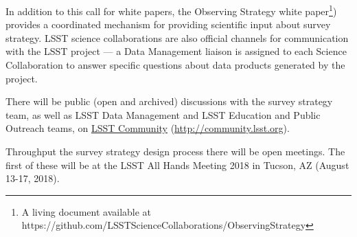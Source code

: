 \documentclass[DM,lsstdraft,toc,usenatbib]{lsstdoc}
\begin{document}
In addition to this call for white papers, the Observing Strategy white paper\footnote{A living document available at https://github.com/LSSTScienceCollaborations/ObservingStrategy}) provides a coordinated mechanism for providing scientific input about survey strategy. LSST science collaborations are also official channels for communication with the LSST project --- a Data Management liaison is assigned to each Science Collaboration to answer specific questions about data products generated by the project.

There will be public (open and archived) discussions with the survey strategy team, as well as LSST Data Management and LSST Education and Public Outreach teams, on \href{http://community.lsst.org}{LSST Community} (\url{http://community.lsst.org}). 

Throughput the survey strategy design process there will be open meetings. The first of these will be at the LSST All Hands Meeting 2018 in Tucson, AZ (August 13-17, 2018). 
\end{document}
